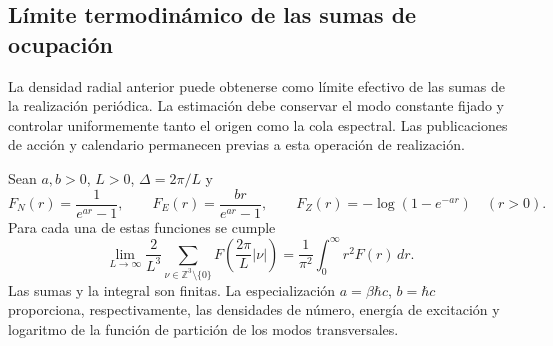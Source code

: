 \subsection{Límite termodinámico de las sumas de ocupación}
\label{v:v:subsec:limite-termodinamico}

La densidad radial anterior puede obtenerse como límite efectivo de las
sumas de la realización periódica. La estimación debe conservar el modo
constante fijado y controlar uniformemente tanto el origen como la cola
espectral. Las publicaciones de acción y calendario permanecen previas
a esta operación de realización.

\begin{lemma}
\label{v:v:lem:limite-termodinamico}
Sean \(a,b>0\), \(L>0\), \(\Delta=2\pi/L\) y
\[
 F_N(r)=\frac{1}{e^{ar}-1},\qquad
 F_E(r)=\frac{br}{e^{ar}-1},\qquad
 F_Z(r)=-\log(1-e^{-ar})\quad(r>0).
\]
Para cada una de estas funciones se cumple
\begin{equation}
 \lim_{L\to\infty}\frac{2}{L^3}
 \sum_{\nu\in\mathbb Z^3\setminus\{0\}}
 F\!\left(\frac{2\pi}{L}|\nu|\right)
 =\frac{1}{\pi^2}\int_0^\infty r^2F(r)\,dr.
 \label{v:v:eq:limite-modos-discretos}
\end{equation}
Las sumas y la integral son finitas. La especialización
\(a=\beta\hbar c\), \(b=\hbar c\) proporciona, respectivamente,
las densidades de número, energía de excitación y logaritmo de la función
de partición de los modos transversales.
\end{lemma}


